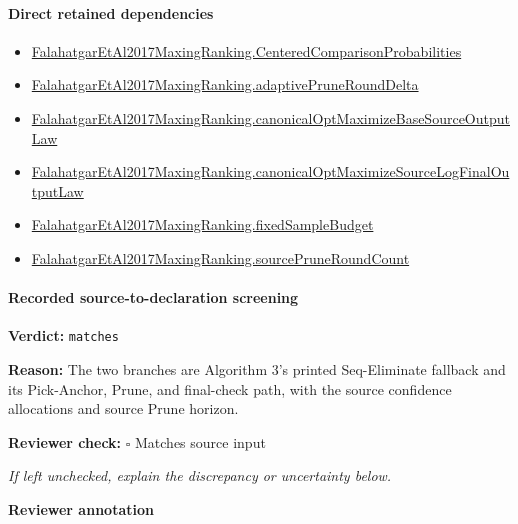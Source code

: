 \documentclass[10pt]{article}
\newcommand{\reviewerbox}{%
  \par\noindent\fbox{\parbox{0.96\linewidth}{\rule{0pt}{0.38in}}}\par
}
\newcommand{\reviewmatch}[1]{%
  \par\noindent\textbf{Reviewer check:} $\square$\; #1\par
  \noindent\emph{If left unchecked, explain the discrepancy or uncertainty below.}\par
}
\begin{document}
\paragraph{Direct retained dependencies}
\begin{itemize}\raggedright
\item \hyperlink{paper-prerequisite-b99b697ef57f53ce}{Falahatgar\allowbreak{}Et\allowbreak{}Al2017\allowbreak{}Maxing\allowbreak{}Ranking.\allowbreak{}Centered\allowbreak{}Comparison\allowbreak{}Probabilities}
\item \hyperlink{governing-declaration-0a2d9c4ad2e46f08}{Falahatgar\allowbreak{}Et\allowbreak{}Al2017\allowbreak{}Maxing\allowbreak{}Ranking.\allowbreak{}adaptive\allowbreak{}Prune\allowbreak{}Round\allowbreak{}Delta}
\item \hyperlink{governing-declaration-4ff81a372167d95b}{Falahatgar\allowbreak{}Et\allowbreak{}Al2017\allowbreak{}Maxing\allowbreak{}Ranking.\allowbreak{}canonical\allowbreak{}Opt\allowbreak{}Maximize\allowbreak{}Base\allowbreak{}Source\allowbreak{}Output\allowbreak{}Law}
\item \hyperlink{governing-declaration-4f5c2355f2465cd5}{Falahatgar\allowbreak{}Et\allowbreak{}Al2017\allowbreak{}Maxing\allowbreak{}Ranking.\allowbreak{}canonical\allowbreak{}Opt\allowbreak{}Maximize\allowbreak{}Source\allowbreak{}Log\allowbreak{}Final\allowbreak{}Output\allowbreak{}Law}
\item \hyperlink{governing-declaration-4b4daf4bb2493573}{Falahatgar\allowbreak{}Et\allowbreak{}Al2017\allowbreak{}Maxing\allowbreak{}Ranking.\allowbreak{}fixed\allowbreak{}Sample\allowbreak{}Budget}
\item \hyperlink{governing-declaration-7a4a97da03826b66}{Falahatgar\allowbreak{}Et\allowbreak{}Al2017\allowbreak{}Maxing\allowbreak{}Ranking.\allowbreak{}source\allowbreak{}Prune\allowbreak{}Round\allowbreak{}Count}
\end{itemize}
\paragraph{Recorded source-to-declaration screening}
\textbf{Verdict:} \texttt{matches}
\\
{\raggedright
\textbf{Reason:} The two branches are Algorithm 3's printed Seq-\allowbreak{}Eliminate fallback and its Pick-\allowbreak{}Anchor, Prune, and final-\allowbreak{}check path, with the source confidence allocations and source Prune horizon.\allowbreak{}
\par}
\reviewmatch{Matches source input}
\noindent\textbf{Reviewer annotation}\par
\reviewerbox
\clearpage
\hypertarget{paper-prerequisite-df9fc1df087145a6}{}
\end{document}
